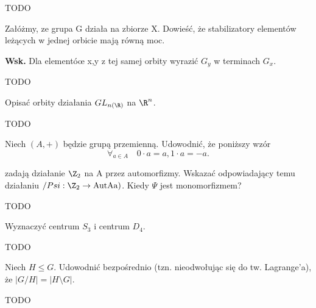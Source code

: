 \begin{solution}
	
	TODO
\end{solution} 
\begin{problem}[7]
	
	Załóżmy, ze grupa G działa na zbiorze X. Dowieść, że stabilizatory elementów leżących w jednej orbicie mają równą moc.

	\textbf{Wsk.} Dla elementóœ x,y z tej samej orbity wyrazić $G_{y}$ w terminach $G_{x}$.
\end{problem} 
\begin{solution}
	
	TODO
\end{solution} 
\begin{problem}[8]
	
	Opisać orbity działania $GL_{n\left( \R \right) }$ na $\R^{n}$.
\end{problem} 
\begin{solution}
	
	TODO
\end{solution} 
\begin{problem}[9]
	
	Niech $\left( A,+ \right) $ będzie grupą przemienną. Udowodnić, że poniższy wzór
	\[
	\forall_{a\in A}\quad  0\cdot a = a, 1\cdot a = -a 
	.\] 

	zadają działanie $\Z_{2}$ na A przez automorfizmy. Wskazać odpowiadający temu działaniu $/Psi: \Z_2 \rightarrow \text{AutAa)}$. Kiedy $\Psi$ jest monomorfizmem?
\end{problem} 
\begin{solution}
	
	TODO
\end{solution} 
\begin{problem}[10]
	
	Wyznaczyć centrum $S_3$ i centrum $D_4$.
\end{problem} 
\begin{solution}
	
	TODO
\end{solution} 
\begin{problem}[11]
	
	Niech $H\le G.$ Udowodnić bezpośrednio (tzn. nieodwołując się do tw. Lagrange'a), że $|G /H| = |H \setminus G|$. 
\end{problem} 
\begin{solution}
	
	TODO
\end{solution} 

